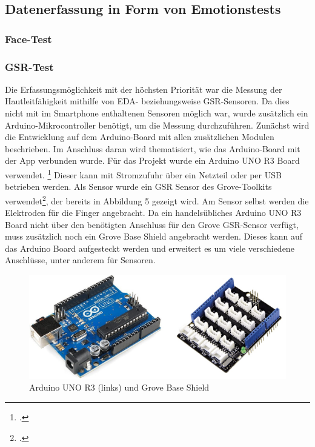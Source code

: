 \subsection{Datenerfassung in Form von Emotionstests}
\subsubsection{Face-Test}
\subsubsection{GSR-Test}
Die Erfassungsmöglichkeit mit der höchsten Priorität war die Messung der Hautleitfähigkeit mithilfe von EDA- beziehungsweise GSR-Sensoren. Da dies nicht mit im Smartphone enthaltenen Sensoren möglich war, wurde zusätzlich ein Arduino-Mikrocontroller benötigt, um die Messung durchzuführen. Zunächst wird die Entwicklung auf dem Arduino-Board mit allen zusätzlichen Modulen beschrieben. Im Anschluss daran wird thematisiert, wie das Arduino-Board mit der App verbunden wurde. \newline
Für das Projekt wurde ein Arduino UNO R3 Board verwendet. \footcite[Vgl.][]{Ard18} Dieser kann mit Stromzufuhr über ein Netzteil oder per USB betrieben werden. Als Sensor wurde ein GSR Sensor des Grove-Toolkits verwendet\footcite[Vgl.][]{Gro18}, der bereits in Abbildung 5 gezeigt wird. Am Sensor selbst werden die Elektroden für die Finger angebracht. Da ein handelsübliches Arduino UNO R3 Board nicht über den benötigten Anschluss für den Grove GSR-Sensor verfügt, muss zusätzlich noch ein Grove Base Shield angebracht werden. Dieses kann auf das Arduino Board aufgesteckt werden und erweitert es um viele verschiedene Anschlüsse, unter anderem für Sensoren.
\begin{figure}[h]
	\centering
	\includegraphics[width=16cm]{Bilder/arduino.jpg}
	\caption[Arduino UNO R3 (links) und Grove Base Shield]{Arduino UNO R3 (links) und Grove Base Shield\footnotemark}
\end{figure}%
